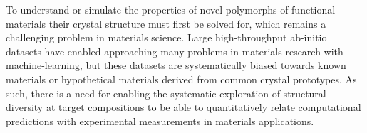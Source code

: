 %



%
%
To understand or simulate the properties of novel polymorphs of functional materials their crystal structure must first be solved for,
which remains a challenging problem in materials science.
\cite{Woodley2008,Graser2018}
%
Large high-throughput ab-initio datasets
\cite{Saal2013,Jain2013,Curtarolo2012}
have enabled approaching many problems in materials research with machine-learning,
\cite{Kirklin2015}
but these datasets are systematically biased towards known materials or hypothetical materials derived from common crystal prototypes.
%
As such, there is a need for enabling the systematic exploration of structural diversity at target compositions to be able to quantitatively relate computational predictions with experimental measurements in materials applications.


